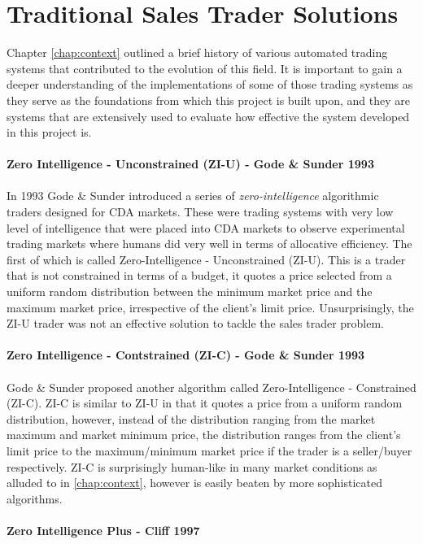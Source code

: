 \documentclass[ %
                    author={Ashwinder Khurana},
                supervisor={Prof Dave Cliff},
                    degree={MEng},
                     title={The Deeply Reinforced Trader},
                  subtitle={},
                      type={enterprise},
                      year={2020} ]{dissertation}
\begin{document}
\section{Traditional Sales Trader Solutions}
Chapter \ref{chap:context} outlined a brief history of various automated trading systems that contributed to the evolution of this field. It is important to gain a deeper understanding of the implementations of some of those trading systems as they serve as the foundations from which this project is built upon, and they are systems that are extensively used to evaluate how effective the system developed in this project is. 
\\
\\
\textbf{Zero Intelligence - Unconstrained (ZI-U) - Gode \& Sunder 1993}
\\
\\
\noindent
In 1993 Gode \& Sunder introduced a series of \textit{zero-intelligence} algorithmic traders designed for CDA markets. These were trading systems with very low level of intelligence that were placed into CDA markets to observe experimental trading markets where humans did very well in terms of allocative efficiency. The first of which is called Zero-Intelligence - Unconstrained (ZI-U). This is a trader that is not constrained in terms of a budget, it quotes a price selected from a uniform random distribution between the minimum market price and the maximum market price, irrespective of the client's limit price. Unsurprisingly, the ZI-U trader was not an effective solution to tackle the sales trader problem. 
\\
\\
\textbf{Zero Intelligence - Contstrained (ZI-C) - Gode \& Sunder 1993}\\
\\
Gode \& Sunder proposed another algorithm called Zero-Intelligence - Constrained (ZI-C). ZI-C is similar to ZI-U in that it quotes a price from a uniform random distribution, however, instead of the distribution ranging from the market maximum and market minimum price, the distribution ranges from the client's limit price to the maximum/minimum market price if the trader is a seller/buyer respectively. ZI-C is surprisingly human-like in many market conditions as alluded to in \ref{chap:context}, however is easily beaten by more sophisticated algorithms. 
\\
\\
\textbf{Zero Intelligence Plus - Cliff 1997}
\\
\\
\end{document}
